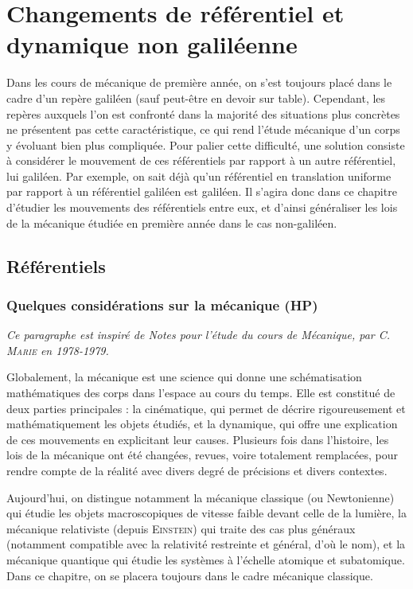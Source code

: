     \chapter{Changements de référentiel et dynamique non galiléenne}
    
    Dans les cours de mécanique de première année, on s'est toujours placé dans le cadre d'un repère galiléen (sauf peut-être en devoir sur table). Cependant, les repères auxquels l'on est confronté dans la majorité des situations plus concrètes ne présentent pas cette caractéristique, ce qui rend l'étude mécanique d'un corps y évoluant bien plus compliquée. Pour palier cette difficulté, une solution consiste à considérer le mouvement de ces référentiels par rapport à un autre référentiel, lui galiléen. Par exemple, on sait déjà qu'un référentiel en translation uniforme par rapport à un référentiel galiléen est galiléen. Il s'agira donc dans ce chapitre d'étudier les mouvements des référentiels entre eux, et d'ainsi généraliser les lois de la mécanique étudiée en première année dans le cas non-galiléen.
    
    \chaptertoc
    
    \section{Référentiels}
    
    \subsection{Quelques considérations sur la mécanique (HP)}
    
    
    \emph{Ce paragraphe est inspiré de \emph{Notes pour l'étude du cours de Mécanique}, par \textsc{C. Marie} en \emph{1978-1979}.}\medskip
    
    Globalement, la mécanique est une science qui donne une schématisation mathématiques des corps dans l'espace au cours du temps. Elle est constitué de deux parties principales : la cinématique, qui permet de décrire rigoureusement et mathématiquement les objets étudiés, et la dynamique, qui offre une explication de ces mouvements en explicitant leur causes. Plusieurs fois dans l'histoire, les lois de la mécanique ont été changées, revues, voire totalement remplacées, pour rendre compte de la réalité avec divers degré de précisions et divers contextes.
    
    Aujourd'hui, on distingue notamment la mécanique classique (ou Newtonienne) qui étudie les objets macroscopiques de vitesse faible devant celle de la lumière, la mécanique relativiste (depuis \textsc{Einstein}) qui traite des cas plus généraux (notamment compatible avec la relativité restreinte et général, d'où le nom), et la mécanique quantique qui étudie les systèmes à l'échelle atomique et subatomique. Dans ce chapitre, on se placera toujours dans le cadre mécanique classique.\medskip
    
